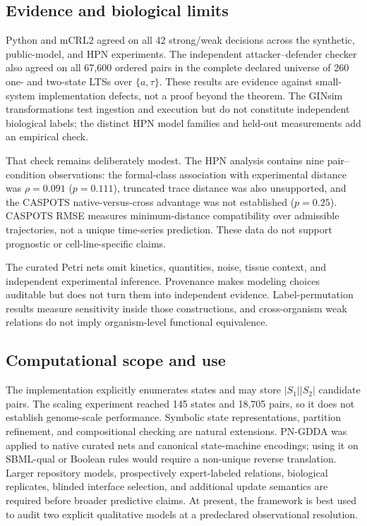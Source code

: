 \documentclass{ws-jbcb}
\numberwithin{equation}{section}
\newcommand{\TAU}{\tau}
\begin{document}
\subsection{Evidence and biological limits}
\label{sec:discussion-biological}

Python and mCRL2 agreed on all 42 strong/weak decisions across the synthetic,
public-model, and HPN experiments. The independent attacker--defender checker
also agreed on all 67,600 ordered pairs in the complete declared universe of 260
one- and two-state LTSs over $\{a,\TAU\}$. These results are evidence against
small-system implementation defects, not a proof beyond the theorem. The GINsim
transformations test ingestion and execution but do not constitute independent
biological labels; the distinct HPN model families and held-out measurements add
an empirical check.

That check remains deliberately modest. The HPN analysis contains nine
pair--condition observations: the formal-class association with experimental
distance was $\rho=0.091$ ($p=0.111$), truncated trace distance was also
unsupported, and the CASPOTS native-versus-cross advantage was not established
($p=0.25$). CASPOTS RMSE measures minimum-distance compatibility over admissible
trajectories, not a unique time-series prediction.\cite{Razzaq2018} These data do
not support prognostic or cell-line-specific claims.

The curated Petri nets omit kinetics, quantities, noise, tissue context, and
independent experimental inference. Provenance makes modeling choices auditable
but does not turn them into independent evidence. Label-permutation results
measure sensitivity inside those constructions, and cross-organism weak
relations do not imply organism-level functional equivalence.

\subsection{Computational scope and use}
\label{sec:discussion-computation}

The implementation explicitly enumerates states and may store
$|S_1||S_2|$ candidate pairs. The scaling experiment reached 145 states and
18,705 pairs, so it does not establish genome-scale performance. Symbolic state
representations, partition refinement, and compositional checking are natural
extensions. PN-GDDA was applied to native curated nets and canonical
state-machine encodings; using it on SBML-qual or Boolean rules would require a
non-unique reverse translation. Larger repository models, prospectively
expert-labeled relations, biological replicates, blinded interface selection,
and additional update semantics are required before broader predictive claims.
At present, the framework is best used to audit two explicit qualitative models
at a predeclared observational resolution.
\end{document}
